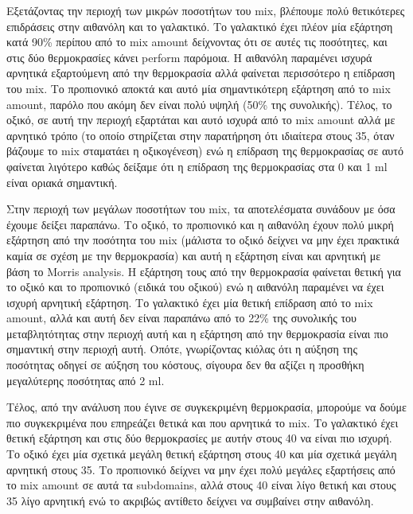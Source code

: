 \documentclass[11pt]{article}
\begin{document}
Εξετάζοντας την περιοχή των μικρών ποσοτήτων του mix, βλέπουμε πολύ θετικότερες επιδράσεις στην αιθανόλη και το γαλακτικό. Το γαλακτικό έχει πλέον μία εξάρτηση κατά 90\% περίπου από το mix amount δείχνοντας ότι σε αυτές τις ποσότητες, και στις δύο θερμοκρασίες κάνει perform παρόμοια. Η αιθανόλη παραμένει ισχυρά αρνητικά εξαρτούμενη από την θερμοκρασία αλλά φαίνεται περισσότερο η επίδραση του mix. Το προπιονικό αποκτά και αυτό μία σημαντικότερη εξάρτηση από το mix amount, παρόλο που ακόμη δεν είναι πολύ υψηλή (50\% της συνολικής). Τέλος, το οξικό, σε αυτή την περιοχή εξαρτάται και αυτό ισχυρά από το mix amount αλλά με αρνητικό τρόπο (το οποίο στηρίζεται στην παρατήρηση ότι ιδιαίτερα στους 35, όταν βάζουμε το mix σταματάει η οξικογένεση) ενώ η επίδραση της θερμοκρασίας σε αυτό φαίνεται λιγότερο καθώς δείξαμε ότι η επίδραση της θερμοκρασίας στα 0 και 1 ml είναι οριακά σημαντική.

Στην περιοχή των μεγάλων ποσοτήτων του mix, τα αποτελέσματα συνάδουν με όσα έχουμε δείξει παραπάνω. Το οξικό, το προπιονικό και η αιθανόλη έχουν πολύ μικρή εξάρτηση από την ποσότητα του mix (μάλιστα το οξικό δείχνει να μην έχει πρακτικά καμία σε σχέση με την θερμοκρασία) και αυτή η εξάρτηση είναι και αρνητική με βάση το Morris analysis. Η εξάρτηση τους από την θερμοκρασία φαίνεται θετική για το οξικό και το προπιονικό (ειδικά του οξικού) ενώ η αιθανόλη παραμένει να έχει ισχυρή αρνητική εξάρτηση. Το γαλακτικό έχει μία θετική επίδραση από το mix amount, αλλά και αυτή δεν είναι παραπάνω από το 22\% της συνολικής του μεταβλητότητας στην περιοχή αυτή και η εξάρτηση από την θερμοκρασία είναι πιο σημαντική στην περιοχή αυτή. Οπότε, γνωρίζοντας κιόλας ότι η αύξηση της ποσότητας οδηγεί σε αύξηση του κόστους, σίγουρα δεν θα αξίζει η προσθήκη μεγαλύτερης ποσότητας από 2 ml.

Τέλος, από την ανάλυση που έγινε σε συγκεκριμένη θερμοκρασία, μπορούμε να δούμε πιο συγκεκριμένα που επηρεάζει θετικά και που αρνητικά το mix. Το γαλακτικό έχει θετική εξάρτηση και στις δύο θερμοκρασίες με αυτήν στους 40 να είναι πιο ισχυρή. Το οξικό έχει μία σχετικά μεγάλη θετική εξάρτηση στους 40 και μία σχετικά μεγάλη αρνητική στους 35. Το προπιονικό δείχνει να μην έχει πολύ μεγάλες εξαρτήσεις από το mix amount σε αυτά τα subdomains, αλλά στους 40 είναι λίγο θετική και στους 35 λίγο αρνητική ενώ το ακριβώς αντίθετο δείχνει να συμβαίνει στην αιθανόλη.
\end{document}
